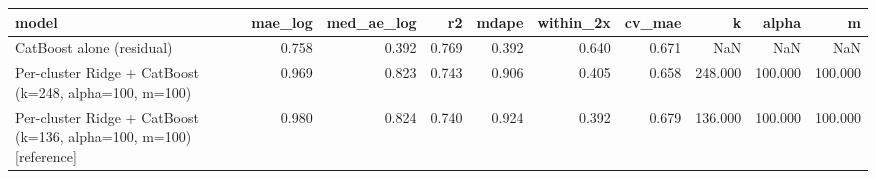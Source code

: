 \begin{tabular}{lrrrrrrrrr}
\toprule
model & mae_log & med_ae_log & r2 & mdape & within_2x & cv_mae & k & alpha & m \\
\midrule
CatBoost alone (residual) & 0.758 & 0.392 & 0.769 & 0.392 & 0.640 & 0.671 & NaN & NaN & NaN \\
Per-cluster Ridge + CatBoost (k=248, alpha=100, m=100) & 0.969 & 0.823 & 0.743 & 0.906 & 0.405 & 0.658 & 248.000 & 100.000 & 100.000 \\
Per-cluster Ridge + CatBoost (k=136, alpha=100, m=100) [reference] & 0.980 & 0.824 & 0.740 & 0.924 & 0.392 & 0.679 & 136.000 & 100.000 & 100.000 \\
\bottomrule
\end{tabular}
